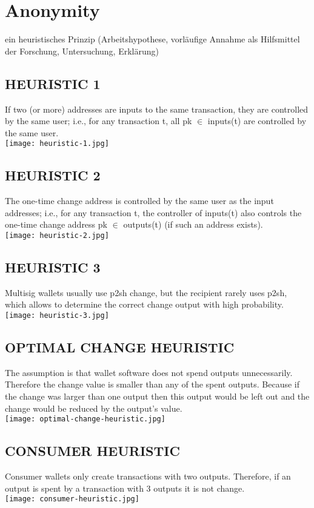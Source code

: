 \section{Anonymity}
ein heuristisches Prinzip (Arbeitshypothese, vorläufige Annahme als Hilfsmittel der Forschung, Untersuchung, Erklärung)
\subsection{HEURISTIC 1}
If two (or more) addresses are inputs to the same transaction, they are controlled by the same user; i.e., for any transaction t, all pk $\in$ inputs(t) are controlled by the same user.\\
\texttt{[image: heuristic-1.jpg]}

\subsection{HEURISTIC 2}
The one-time change address is controlled by the same user as the input addresses; i.e., for any transaction t, the controller of inputs(t) also controls the one-time change address pk $\in$ outputs(t) (if  such an address exists).\\
\texttt{[image: heuristic-2.jpg]}

\subsection{HEURISTIC 3}
Multisig wallets usually use p2sh change, but the recipient rarely uses p2sh, which allows to determine the correct change output with high probability.\\
\texttt{[image: heuristic-3.jpg]}

\subsection{OPTIMAL CHANGE HEURISTIC}
The assumption is that wallet software does not spend outputs unnecessarily. Therefore the change value is smaller than any of the spent outputs. Because if the change was larger than one output then this output would be left out and the change would be reduced by the output's value.\\
\texttt{[image: optimal-change-heuristic.jpg]}

\subsection{CONSUMER HEURISTIC}
Consumer wallets only create transactions with two outputs. Therefore, if an output is spent by a transaction with 3 outputs it is not change.\\
\texttt{[image: consumer-heuristic.jpg]}

